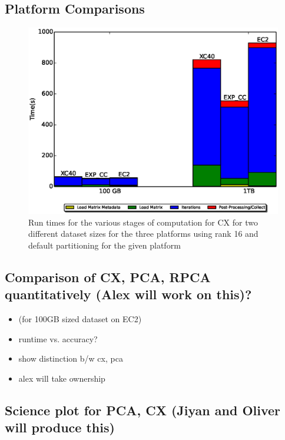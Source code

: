   \subsection{Platform Comparisons}
    
    \begin{figure} [H]
    \begin{centering}
    \includegraphics[scale=0.4]{images/CX_Size_Scaling_Rank_16_Partitions_default.eps}
    \end{centering}
    \caption{ Run times for the various stages of computation for CX for two different dataset sizes for the three platforms using rank 16 and default partitioning for the given platform} 
    \label{fig:h2hrank16} 
    \end{figure}

    
  

  

  \subsection{Comparison of CX, PCA, RPCA quantitatively (Alex will work on this)? }
    \begin{itemize}
      \item (for 100GB sized dataset on EC2)
      \item runtime vs. accuracy?
      \item show distinction b/w cx, pca
      \item alex will take ownership
    \end{itemize}

  \subsection{Science plot for PCA, CX (Jiyan and Oliver will produce this)}

